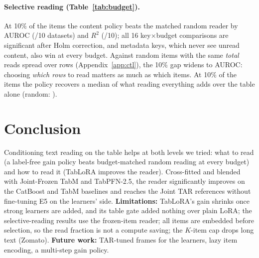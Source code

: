\documentclass{article}
\begin{document}
\begin{table}[t]
\caption{Selective reading (frozen-item reader): gain policy minus a random reader with the same per-row number of reads, per nominal budget. ``read'': achieved test fraction; $p_{\text{Holm}}$: Wilcoxon $p$, Holm-adjusted~\cite{holm1979} over the 8 key$\times$budget cells per family.}
\label{tab:budget}
\centering
\footnotesize
\setlength{\tabcolsep}{4pt}

\end{table}

\paragraph{Selective reading (Table~\ref{tab:budget}).}
At 10\% of the items the content policy beats the matched random reader by \gainContentTenClsDelta{} AUROC (\gainContentTenClsWins/10 datasets) and \gainContentTenRegDelta{} $R^2$ (\gainContentTenRegWins/10); all 16 key$\times$budget comparisons are significant after Holm correction, and metadata keys, which never see unread content, also win at every budget.
Against random items with the same \emph{total} reads spread over rows (Appendix~\ref{app:ctl}), the 10\% gap widens to \ctlTotalContentTenClsDelta{} AUROC: choosing \emph{which rows} to read matters as much as which items.
At 10\% of the items the policy recovers a median \recContentTen{} of what reading everything adds over the table alone (random: \recRandomContentTen).

\section{Conclusion}

Conditioning text reading on the table helps at both levels we tried: what to read (a label-free gain policy beats budget-matched random reading at every budget) and how to read it (TabLoRA improves the reader).
Cross-fitted and blended with Joint-Frozen TabM and TabPFN-2.5, the reader significantly improves on the CatBoost and TabM baselines and reaches the Joint TAR references without fine-tuning E5 on the learners' side.
\textbf{Limitations:} TabLoRA's gain shrinks once strong learners are added, and its table gate added nothing over plain LoRA; the selective-reading results use the frozen-item reader; all items are embedded before selection, so the read fraction is not a compute saving; the $K$-item cap drops long text (Zomato).
\textbf{Future work:} TAR-tuned frames for the learners, lazy item encoding, a multi-step gain policy.
\end{document}
